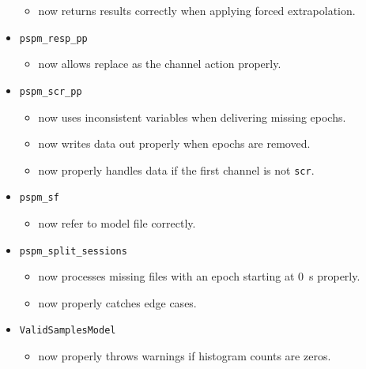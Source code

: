 \documentclass[english]{article}
\numberwithin{equation}{section}
\numberwithin{figure}{section}
\begin{document}
\begin{itemize}
  \begin{itemize}
  \item now returns results correctly when applying forced extrapolation.
  \end{itemize}
\item \texttt{pspm\_resp\_pp}
  \begin{itemize}
  \item now allows replace as the channel action properly.
  \end{itemize}
\item \texttt{pspm\_scr\_pp}
  \begin{itemize}
  \item now uses inconsistent variables when delivering missing epochs.
  \item now writes data out properly when epochs are removed.
  \item now properly handles data if the first channel is not \texttt{scr}.
  \end{itemize}
\item \texttt{pspm\_sf}
  \begin{itemize}
  \item now refer to model file correctly.
  \end{itemize}
\item \texttt{pspm\_split\_sessions}
  \begin{itemize}
  \item now processes missing files with an epoch starting at 0~s properly.
  \item now properly catches edge cases.
  \end{itemize}
\item \texttt{ValidSamplesModel}
  \begin{itemize}
  \item now properly throws warnings if histogram counts are zeros.
  \end{itemize}
\end{itemize}
\end{document}
